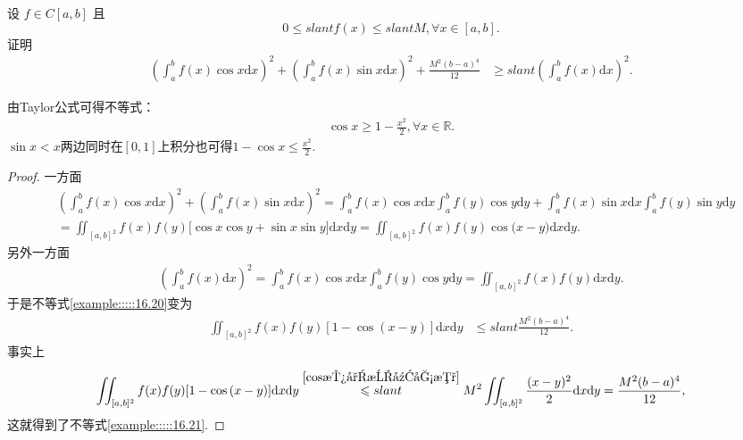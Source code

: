 \documentclass[../../main.tex]{subfiles}
\begin{document}
\begin{example}
设 $f \in C[a,b]$ 且
\[0 \leqslant slant f(x) \leqslant slant M, \forall x \in [a,b].\]
证明
\begin{align}\label{example:::::16.20}
\left(\int_{a}^{b}f(x)\cos x\mathrm{d}x\right)^2 + \left(\int_{a}^{b}f(x)\sin x\mathrm{d}x\right)^2 + \frac{M^2(b - a)^4}{12} &\geqslant slant \left(\int_{a}^{b}f(x)\mathrm{d}x\right)^2.
\end{align}
\end{example}
\begin{remark}
由Taylor公式可得不等式：
\begin{align}\label{cos放小成幂函数}
\cos x\geqslant  1-\frac{x^2}{2},\forall x\in \mathbb{R}.
\end{align}
$\sin x<x$两边同时在$[0,1]$上积分也可得$1-\cos x\leqslant \frac{x^2}{2}$.
\end{remark}
\begin{proof}
一方面
\begin{align*}
&\left( \int_a^b{f(x)\cos x\mathrm{d}x} \right) ^2+\left( \int_a^b{f(x)\sin x\mathrm{d}x} \right) ^2=\int_a^b{f(x)\cos x\mathrm{d}x}\int_a^b{f(y)\cos y\mathrm{d}y}+\int_a^b{f(x)\sin x\mathrm{d}x}\int_a^b{f(y)\sin y\mathrm{d}y}
\\
&=\iint_{[a,b]^2}{f(x)f(y)[\cos x\cos y}+\sin x\sin y]\mathrm{d}x\mathrm{d}y=\iint_{[a,b]^2}{f(x)f(y)\cos\mathrm{(}x}-y)\mathrm{d}x\mathrm{d}y.
\end{align*}
另外一方面
\begin{align*}
\left( \int_a^b{f(x)\mathrm{d}x} \right) ^2=\int_a^b{f(x)\cos x\mathrm{d}x}\int_a^b{f(y)\cos y\mathrm{d}y}=\iint_{[a,b]^2}{f(x)f(y)\mathrm{d}x\mathrm{d}y.}
\end{align*}
于是不等式\eqref{example:::::16.20}变为
\begin{align}\label{example:::::16.21}
\iint_{[a,b]^2}f(x)f(y)[1 - \cos(x - y)]\mathrm{d}x\mathrm{d}y &\leqslant slant \frac{M^2(b - a)^4}{12}.
\end{align}
事实上
\begin{align*}
\iint_{[a,b]^2}{f(x)f(y)[1}-\cos\mathrm{(}x-y)]\mathrm{d}x\mathrm{d}y\overset{\eqref{cos放小成幂函数}}{\leqslant slant}M^2\iint_{[a,b]^2}{\frac{(x-y)^2}{2}\mathrm{d}x\mathrm{d}y}=\frac{M^2(b-a)^4}{12},
\end{align*}
这就得到了不等式\eqref{example:::::16.21}. 
\end{proof}
\end{document}
